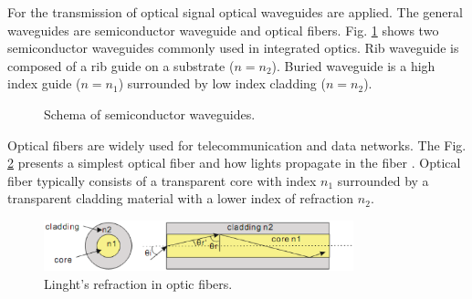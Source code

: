 For the transmission of optical signal optical waveguides are applied. The general waveguides are semiconductor waveguide and optical fibers. 
Fig. \ref{fig:semi_waveguides} shows two semiconductor waveguides commonly used in integrated optics. Rib waveguide is composed of a rib guide on a substrate ($n=n_{2}$). Buried waveguide is a high index guide ($n=n_{1}$) surrounded by low index cladding ($n=n_{2}$).\\

\begin{figure}[!ht]
\centering
{}
\hfill
{}
\caption{Schema of semiconductor waveguides.}
\label{fig:semi_waveguides}
\end{figure}
Optical fibers are widely used for telecommunication and data networks. The Fig. \ref{fig:opticfiber} presents a simplest optical fiber and how lights propagate in the fiber . Optical fiber typically consists of a transparent core with index $n_{1}$ surrounded by a transparent cladding material with a lower index of refraction $n_{2}$.\\
 
\begin{figure}[httbp]
\centering
\includegraphics[width=0.8\textwidth]{bilder/opticfiber}
\caption{Linght's refraction in optic fibers.}
\label{fig:opticfiber}
\end{figure}

